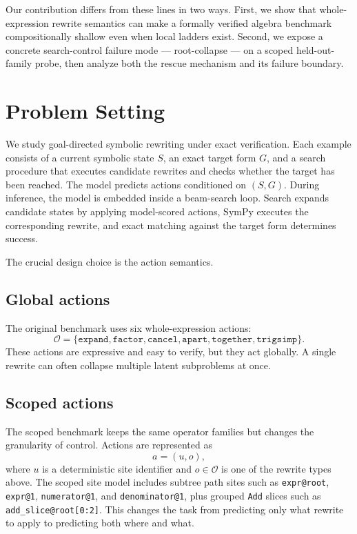 \documentclass[11pt]{article}
\newcommand{\sympy}{SymPy}
\begin{document}
Our contribution differs from these lines in two ways. First, we show that whole-expression rewrite semantics can make a formally verified algebra benchmark compositionally shallow even when local ladders exist. Second, we expose a concrete search-control failure mode --- root-collapse --- on a scoped held-out-family probe, then analyze both the rescue mechanism and its failure boundary.

\section{Problem Setting}

We study goal-directed symbolic rewriting under exact verification. Each example consists of a current symbolic state $S$, an exact target form $G$, and a search procedure that executes candidate rewrites and checks whether the target has been reached. The model predicts actions conditioned on $(S,G)$. During inference, the model is embedded inside a beam-search loop. Search expands candidate states by applying model-scored actions, \sympy{} executes the corresponding rewrite, and exact matching against the target form determines success.

The crucial design choice is the action semantics.

\subsection{Global actions}

The original benchmark uses six whole-expression actions:
\[
\mathcal{O}=\{\texttt{expand},\texttt{factor},\texttt{cancel},\texttt{apart},\texttt{together},\texttt{trigsimp}\}.
\]
These actions are expressive and easy to verify, but they act globally. A single rewrite can often collapse multiple latent subproblems at once.

\subsection{Scoped actions}

The scoped benchmark keeps the same operator families but changes the granularity of control. Actions are represented as
\[
a=(u,o),
\]
where $u$ is a deterministic site identifier and $o\in\mathcal{O}$ is one of the rewrite types above. The scoped site model includes subtree path sites such as \texttt{expr@root}, \texttt{expr@1}, \texttt{numerator@1}, and \texttt{denominator@1}, plus grouped \texttt{Add} slices such as \texttt{add\_slice@root[0:2]}. This changes the task from predicting only what rewrite to apply to predicting both where and what.
\end{document}
